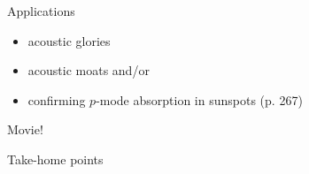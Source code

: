 \documentclass{beamer}
\begin{document}
\begin{frame}{Applications}
    \begin{itemize}
        \item acoustic glories
        \item acoustic moats and/or
        \item confirming $p$-mode absorption in sunspots (p. 267)
    \end{itemize}
\end{frame}

\begin{frame}{Movie!}
\end{frame}

\begin{frame}{Take-home points}
\end{frame}

\end{document}
